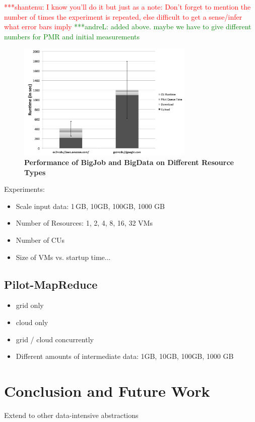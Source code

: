 \documentclass[times]{cpeauth}
\newcommand{\jhanote}[1]{ {\textcolor{red} { ***shantenu: #1 }}}
\newcommand{\alnote}[1]{ {\textcolor{green} { ***andreL: #1 }}}
\newcommand{\alnote}[1]{}
\newcommand{\jhanote}[1]{}
\begin{document}
\jhanote{I know you'll do it but just as a
  note: Don't forget to mention the number of times the experiment is
  repeated, else difficult to get a sense/infer what error bars 
imply}\alnote{added above. maybe we have to give different numbers for PMR and 
initial measurements}
\begin{figure}[htbp]
	\centering
		\includegraphics[width=0.75\textwidth]{performance/pd_google_aws.pdf}
	\caption{\textbf{Performance of BigJob and BigData on Different Resource Types}}
	\label{fig:performance_pd_google_aws}
\end{figure}



Experiments:
\begin{itemize}
	\item Scale input data: 1\,GB, 10GB, 100GB, 1000 GB
	\item Number of Resources: 1, 2, 4, 8, 16, 32 VMs
	\item Number of CUs
	\item Size of VMs vs. startup time...
\end{itemize}



\subsection{Pilot-MapReduce}
\begin{itemize}
	\item grid only
	\item cloud only
	\item grid / cloud concurrently
	\item  Different amounts of intermediate data: 1GB, 10GB, 100GB, 1000 GB	
\end{itemize}

\section{Conclusion and Future Work}

Extend to other data-intensive abstractions



\end{document}
